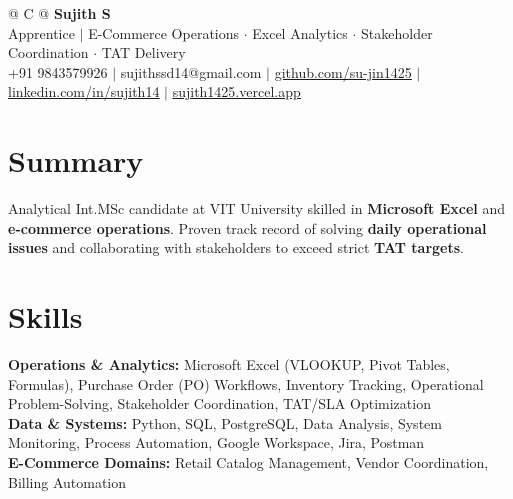 \documentclass[a4paper,10pt]{article}
\newcommand{\ulink}[2]{\href{#1}{\uline{#2}}}
\begin{document}
\pagestyle{empty}

\begin{tabularx}{\linewidth}{@{} C @{}}
{\color[HTML]{000000}\fontsize{30}{35}\selectfont\bfseries Sujith S} \\[5pt]
{\fontsize{10.5}{12.5}\selectfont\color[HTML]{3A3A3A}
Apprentice $|$ E-Commerce Operations $\cdot$ Excel Analytics $\cdot$ Stakeholder Coordination $\cdot$ TAT Delivery} \\[6pt]
{\fontsize{9.5}{11.5}\selectfont\textcolor[HTML]{3A3A3A}{+91 9843579926 $|$ sujithssd14@gmail.com $|$ \ulink{https://github.com/su-jin1425}{github.com/su-jin1425} $|$ \ulink{https://linkedin.com/in/sujith14}{linkedin.com/in/sujith14} $|$ \ulink{https://sujith1425.vercel.app}{sujith1425.vercel.app}}}
\end{tabularx}

\vspace{2pt}

\section{Summary}
\vspace{3pt}
{\color[HTML]{0A0A0A}\fontsize{11}{14}\selectfont
Analytical Int.MSc candidate at VIT University skilled in \textbf{Microsoft Excel} and \textbf{e-commerce operations}. Proven track record of solving \textbf{daily operational issues} and collaborating with stakeholders to exceed strict \textbf{TAT targets}.}

\vspace{2pt}

\section{Skills}
\vspace{3pt}
{\color[HTML]{0A0A0A}\fontsize{11}{14}\selectfont
\textbf{Operations \& Analytics:} Microsoft Excel (VLOOKUP, Pivot Tables, Formulas), Purchase Order (PO) Workflows, Inventory Tracking, Operational Problem-Solving, Stakeholder Coordination, TAT/SLA Optimization \\[2pt]
\textbf{Data \& Systems:} Python, SQL, PostgreSQL, Data Analysis, System Monitoring, Process Automation, Google Workspace, Jira, Postman \\[2pt]
\textbf{E-Commerce Domains:} Retail Catalog Management, Vendor Coordination, Billing Automation}

\vspace{2pt}
\end{document}
